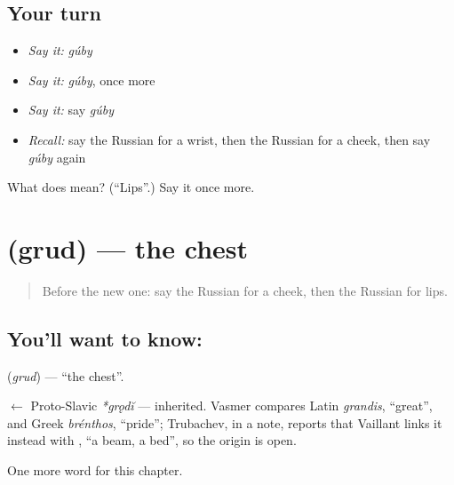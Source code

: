 \subsection*{Your turn}
\begin{itemize}
\raggedright
  \item \emph{Say it:} \emph{gúby}
  \item \emph{Say it:} \emph{gúby}, once more
  \item \emph{Say it:} say \emph{gúby}
  \item \emph{Recall:} say the Russian for a wrist, then the Russian for a cheek, then say \emph{gúby} again
\end{itemize}

\begin{tcolorbox}[breakable,colback=teal!4,colframe=teal!35!black,title={Before you move on}]
What does  mean? (\textquotedblleft{}Lips\textquotedblright{}.) Say it once more.
\end{tcolorbox}
\section[\texorpdfstring{\ru{грудь} (grud)}{грудь (grud)}]{ (grud) — the chest}

\label{lesson:RU-C119-chest}



\begin{quote}
Before the new one: say the Russian for a cheek, then the Russian for lips.
\end{quote}

\subsection*{You'll want to know: }
\textbf{} (\emph{grud}) — \textquotedblleft{}the chest\textquotedblright{}.

\begin{cousinweb}
\textbf{} $\leftarrow$ Proto-Slavic \emph{*grǫdĭ} — inherited. Vasmer compares Latin \emph{grandis}, \textquotedblleft{}great\textquotedblright{}, and Greek \emph{brénthos}, \textquotedblleft{}pride\textquotedblright{}; Trubachev, in a note, reports that Vaillant links it instead with \emph{}, \textquotedblleft{}a beam, a bed\textquotedblright{}, so the origin is open.
\end{cousinweb}

\begin{grammarlens}[title={What you've built}]
One more word for this chapter.
\end{grammarlens}

